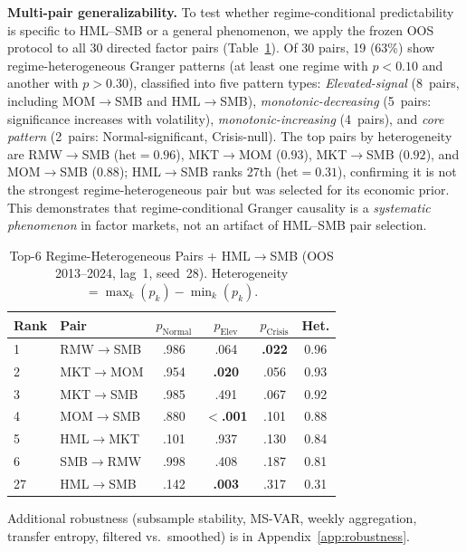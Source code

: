 \documentclass[sigconf,anonymous]{acmart}
\begin{document}
\textbf{Multi-pair generalizability.}
To test whether regime-conditional predictability is specific to HML--SMB
or a general phenomenon, we apply the frozen OOS protocol to all 30
directed factor pairs (Table~\ref{tab:generalize}).
Of 30 pairs, 19 (63\%) show regime-heterogeneous Granger patterns
(at least one regime with $p < 0.10$ and another with $p > 0.30$),
classified into five pattern types: \emph{Elevated-signal} (8~pairs,
including MOM$\to$SMB and HML$\to$SMB), \emph{monotonic-decreasing}
(5~pairs: significance increases with volatility), \emph{monotonic-increasing}
(4~pairs), and \emph{core pattern} (2~pairs: Normal-significant, Crisis-null).
The top pairs by heterogeneity are RMW$\to$SMB ($\text{het} = 0.96$),
MKT$\to$MOM ($0.93$), MKT$\to$SMB ($0.92$), and MOM$\to$SMB ($0.88$);
HML$\to$SMB ranks 27th ($\text{het} = 0.31$), confirming it is not
the strongest regime-heterogeneous pair but was selected for its
economic prior.
This demonstrates that regime-conditional Granger causality is a
\emph{systematic phenomenon} in factor markets, not an artifact
of HML--SMB pair selection.

\begin{table}[t]
\centering
\caption{Top-6 Regime-Heterogeneous Pairs + HML$\to$SMB (OOS 2013--2024, lag~1, seed~28). Heterogeneity $= \max_k(p_k) - \min_k(p_k)$.}
\label{tab:generalize}
\scriptsize
\begin{tabular}{@{}llcccc@{}}
\toprule
Rank & Pair & $p_{\text{Normal}}$ & $p_{\text{Elev}}$ & $p_{\text{Crisis}}$ & Het. \\
\midrule
1 & RMW$\to$SMB & .986 & .064 & \textbf{.022} & 0.96 \\
2 & MKT$\to$MOM & .954 & \textbf{.020} & .056 & 0.93 \\
3 & MKT$\to$SMB & .985 & .491 & .067 & 0.92 \\
4 & MOM$\to$SMB & .880 & \textbf{$<$.001} & .101 & 0.88 \\
5 & HML$\to$MKT & .101 & .937 & .130 & 0.84 \\
6 & SMB$\to$RMW & .998 & .408 & .187 & 0.81 \\
\midrule
27 & HML$\to$SMB & .142 & \textbf{.003} & .317 & 0.31 \\
\bottomrule
\end{tabular}
\end{table}

Additional robustness (subsample stability, MS-VAR, weekly aggregation,
transfer entropy, filtered vs.\ smoothed) is in Appendix~\ref{app:robustness}.
\end{document}

